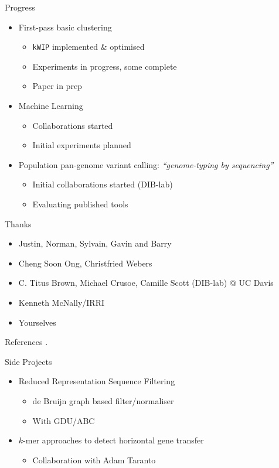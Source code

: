 \documentclass[t]{beamer}
\begin{document}
\begin{frame}{Progress}
  \begin{itemize}
    \item First-pass basic clustering
      \begin{itemize}
        \item \texttt{kWIP} implemented \& optimised
        \item Experiments in progress, some complete
        \item Paper in prep
      \end{itemize}
      \pause
    \item Machine Learning
      \begin{itemize}
        \item Collaborations started
        \item Initial experiments planned
      \end{itemize}
      \pause
    \item Population pan-genome variant calling: \textit{``genome-typing by sequencing''}
        \begin{itemize}
          \item Initial collaborations started (DIB-lab)
          \item Evaluating published tools
        \end{itemize}
  \end{itemize}
\end{frame}

\begin{frame}{Thanks}
  \begin{itemize}
    \item Justin, Norman, Sylvain, Gavin and Barry
    \item Cheng Soon Ong, Christfried Webers
    \item C. Titus Brown, Michael Crusoe, Camille Scott (DIB-lab) @ UC Davis
    \item Kenneth McNally/IRRI
    \item Yourselves
  \end{itemize}
\end{frame}

\begin{frame}[shrink=20]{References}
  \printbibliography
  \vfill
  .
\end{frame}

\begin{frame}{Side Projects}
  \begin{itemize}
    \item Reduced Representation Sequence Filtering
      \begin{itemize}
        \item de Bruijn graph based filter/normaliser
        \item With GDU/ABC
      \end{itemize}
    \item $k$-mer approaches to detect horizontal gene transfer
      \begin{itemize}
        \item Collaboration with Adam Taranto
      \end{itemize}
  \end{itemize}
\end{frame}
\end{document}
